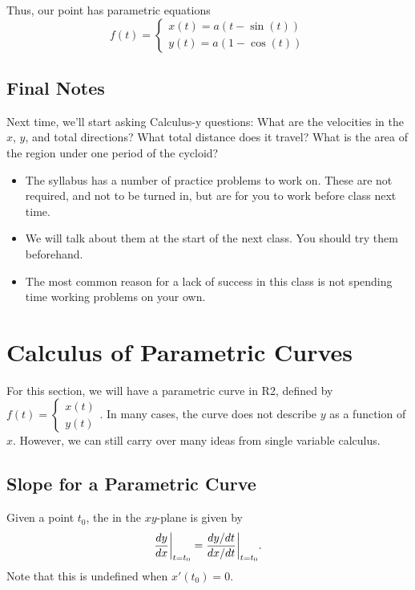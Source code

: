 Thus, our point has parametric equations
\[
    f(t) = \begin{cases}
        x(t) = a(t - \sin(t)) \\
        y(t) = a(1 - \cos(t))
    \end{cases}
\]

\subsection{Final Notes}

Next time, we'll start asking Calculus-y questions: What are the velocities in the \(x\), \(y\), and total directions? What total distance does it travel? What is the area of the region under one period of the cycloid?
\begin{itemize}
    \item The syllabus has a number of practice problems to work on. These are not required, and not to be
          turned in, but are for you to work before class next time.
    \item We will talk about them at the start of the next class. You should try them beforehand.
    \item The most common reason for a lack of success in this class is not spending time working problems on
          your own.
\end{itemize}

\section{Calculus of Parametric Curves}

For this section, we will have a parametric curve in R2, defined by \(f(t) = \begin{cases}
    x(t) \\
    y(t)
\end{cases}.\) 
In many cases, the curve does not describe \(y\) as a function of \(x\). However, we can still carry over many ideas from single variable calculus.

\subsection{Slope for a Parametric Curve}

Given a point \(t_{0}\), the  in the \(xy\)-plane is given by
\[
    \frac{dy}{dx}\bigg|_{t = t_{0}} = \frac{dy/dt}{dx/dt}\bigg|_{t = t_{0}}. \\
\]
Note that this is undefined when \(x'(t_{0}) = 0\). \\

